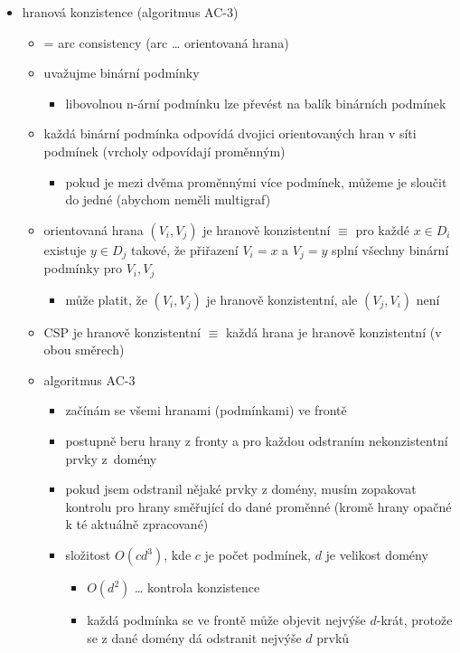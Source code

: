 \begin{itemize}
\begin{itemize}
\begin{itemize}
\end{itemize}
\end{itemize}
\item hranová konzistence (algoritmus AC-3)
\begin{itemize}
\item = arc consistency (arc \dots{} orientovaná hrana)
\item uvažujme binární podmínky
\begin{itemize}
\item libovolnou n-ární podmínku lze převést na balík binárních podmínek
\end{itemize}
\item každá binární podmínka odpovídá dvojici orientovaných hran v síti podmínek (vrcholy odpovídají proměnným)
\begin{itemize}
\item pokud je mezi dvěma proměnnými více podmínek, můžeme je sloučit do jedné (abychom neměli multigraf)
\end{itemize}
\item orientovaná hrana $(V_i,V_j)$ je hranově konzistentní $\equiv$ pro každé $x\in D_i$ existuje $y\in D_j$ takové, že přiřazení $V_i=x$ a $V_j=y$ splní všechny binární podmínky pro $V_i,V_j$
\begin{itemize}
\item může platit, že $(V_i,V_j)$ je hranově konzistentní, ale $(V_j,V_i)$ není
\end{itemize}
\item CSP je hranově konzistentní $\equiv$ každá hrana je hranově konzistentní (v obou směrech)
\item algoritmus AC-3
\begin{itemize}
\item začínám se všemi hranami (podmínkami) ve frontě
\item postupně beru hrany z fronty a pro každou odstraním nekonzistentní prvky z~domény
\item pokud jsem odstranil nějaké prvky z domény, musím zopakovat kontrolu pro hrany směřující do dané proměnné (kromě hrany opačné k té aktuálně zpracované)
\item složitost $O(cd^3)$, kde $c$ je počet podmínek, $d$ je velikost domény
\begin{itemize}
\item $O(d^2)$ \dots{} kontrola konzistence
\item každá podmínka se ve frontě může objevit nejvýše $d$-krát, protože se z dané domény dá odstranit nejvýše $d$ prvků

\end{itemize}
\end{itemize}
\end{itemize}
\end{itemize}
